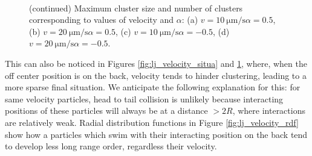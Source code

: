 \documentclass[../../master_thesis_np.tex]{subfiles}
\begin{document}
		\begin{figure}
			\centering
			\ContinuedFloat

			\\

			\caption{(continued) Maximum cluster size and number of clusters corresponding to values of velocity and $\alpha$: (a) $v = \SI{10}{\um \per \second} \alpha = 0.5$, (b) $v = \SI{20}{\um \per \second} \alpha = 0.5$, (c) $v = \SI{10}{\um \per \second} \alpha = -0.5$, (d) $v = \SI{20}{\um \per \second} \alpha = -0.5$.}
			\label{fig:lj_velocity_cluster}
		\end{figure}

		This can also be noticed in Figures \ref{fig:lj_velocity_situa} and \ref{fig:lj_velocity_cluster}, where, when the off center position is on the back, velocity tends to hinder clustering, leading to a more sparse final situation. 
		We anticipate the following explanation for this: for same velocity particles, head to tail collision is unlikely because interacting positions of these particles will always be at a distance $> 2R$, where interactions are relatively weak.
		Radial distribution functions in Figure \ref{fig:lj_velocity_rdf} show how a particles which swim with their interacting position on the back tend to develop less long range order, regardless their velocity.
		
\end{document}

